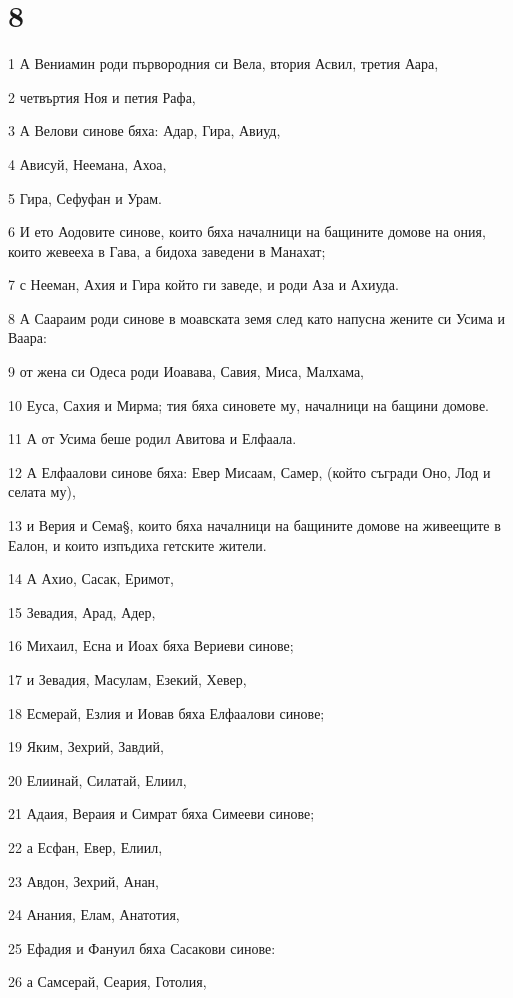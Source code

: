 \chapter{8}

\par 1 А Вениамин роди първородния си Вела, втория Асвил, третия Аара,
\par 2 четвъртия Ноя и петия Рафа,
\par 3 А Велови синове бяха: Адар, Гира, Авиуд,
\par 4 Ависуй, Неемана, Ахоа,
\par 5 Гира, Сефуфан и Урам.
\par 6 И ето Аодовите синове, които бяха началници на бащините домове на ония, които жевееха в Гава, а бидоха заведени в Манахат;
\par 7 с Нееман, Ахия и Гира който ги заведе, и роди Аза и Ахиуда.
\par 8 А Саараим роди синове в моавската земя след като напусна жените си Усима и Ваара:
\par 9 от жена си Одеса роди Иоавава, Савия, Миса, Малхама,
\par 10 Еуса, Сахия и Мирма; тия бяха синовете му, началници на бащини домове.
\par 11 А от Усима беше родил Авитова и Елфаала.
\par 12 А Елфаалови синове бяха: Евер Мисаам, Самер, (който съгради Оно, Лод и селата му),
\par 13 и Верия и Сема§, които бяха началници на бащините домове на живеещите в Еалон, и които изпъдиха гетските жители.
\par 14 А Ахио, Сасак, Еримот,
\par 15 Зевадия, Арад, Адер,
\par 16 Михаил, Есна и Иоах бяха Вериеви синове;
\par 17 и Зевадия, Масулам, Езекий, Хевер,
\par 18 Есмерай, Езлия и Иовав бяха Елфаалови синове;
\par 19 Яким, Зехрий, Завдий,
\par 20 Елиинай, Силатай, Елиил,
\par 21 Адаия, Вераия и Симрат бяха Симееви синове;
\par 22 а Есфан, Евер, Елиил,
\par 23 Авдон, Зехрий, Анан,
\par 24 Анания, Елам, Анатотия,
\par 25 Ефадия и Фануил бяха Сасакови синове:
\par 26 а Самсерай, Сеария, Готолия,
